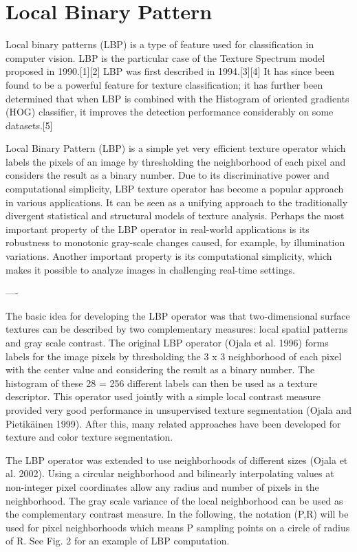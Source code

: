 \section{Local Binary Pattern}

Local binary patterns (LBP) is a type of feature used for classification in computer vision. LBP is the particular case of the Texture Spectrum model proposed in 1990.[1][2] LBP was first described in 1994.[3][4] It has since been found to be a powerful feature for texture classification; it has further been determined that when LBP is combined with the Histogram of oriented gradients (HOG) classifier, it improves the detection performance considerably on some datasets.[5]

Local Binary Pattern (LBP) is a simple yet very efficient texture operator which labels the pixels of an image by thresholding the neighborhood of each pixel and considers the result as a binary number. Due to its discriminative power and computational simplicity, LBP texture operator has become a popular approach in various applications. It can be seen as a unifying approach to the traditionally divergent statistical and structural models of texture analysis. Perhaps the most important property of the LBP operator in real-world applications is its robustness to monotonic gray-scale changes caused, for example, by illumination variations. Another important property is its computational simplicity, which makes it possible to analyze images in challenging real-time settings. 


----

The basic idea for developing the LBP operator was that two-dimensional surface textures can be described by two complementary measures: local spatial patterns and gray scale contrast. The original LBP operator (Ojala et al. 1996) forms labels for the image pixels by thresholding the 3 x 3 neighborhood of each pixel with the center value and considering the result as a binary number. The histogram of these 28 = 256 different labels can then be used as a texture descriptor. This operator used jointly with a simple local contrast measure provided very good performance in unsupervised texture segmentation (Ojala and Pietikäinen 1999). After this, many related approaches have been developed for texture and color texture segmentation.

The LBP operator was extended to use neighborhoods of different sizes (Ojala et al. 2002). Using a circular neighborhood and bilinearly interpolating values at non-integer pixel coordinates allow any radius and number of pixels in the neighborhood. The gray scale variance of the local neighborhood can be used as the complementary contrast measure. In the following, the notation (P,R) will be used for pixel neighborhoods which means P sampling points on a circle of radius of R. See Fig. 2 for an example of LBP computation. 



